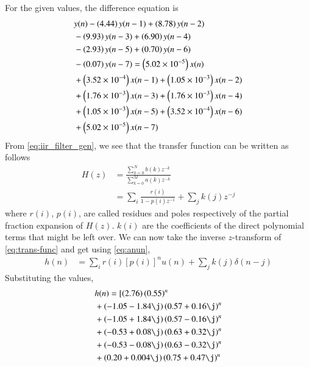 \documentclass[journal,12pt,twocolumn]{IEEEtran}
\renewcommand\thesection{\arabic{section}}
\begin{document}
\begin{enumerate}[label=\thesection.\arabic*]
\begin{enumerate}[label=\thesection.\arabic*]
	 For the given values, the difference equation is
	 \begin{align}
		 &y(n) - \left(4.44\right)y(n - 1) + \left(8.78\right)y(n - 2) \nonumber \\
		 &- \left(9.93\right)y(n - 3) + \left(6.90\right)y(n - 4) \nonumber \\
		 &- \left(2.93\right)y(n - 5) \nonumber + \left(0.70\right)y(n - 6) \nonumber \\
		 &- \left(0.07\right)y(n - 7) = \left(5.02 \times 10^{-5}\right)x(n) \nonumber \\
		 &+ \left(3.52 \times 10^{-4}\right)x(n - 1) + \left(1.05 \times 10^{-3}\right)x(n - 2) \nonumber \\
		 &+ \left(1.76 \times 10^{-3}\right)x(n - 3) + \left(1.76 \times 10^{-3}\right)x(n - 4) \nonumber \\
		 &+ \left(1.05 \times 10^{-3}\right)x(n - 5) + \left(3.52 \times 10^{-4}\right)x(n - 6) \nonumber \\
		 &+ \left(5.02 \times 10^{-5}\right)x(n - 7)
	 \end{align}
	 From \eqref{eq:iir_filter_gen}, we see that the transfer function can be written as follows
	 \begin{align}
		 H(z) &= \frac{\sum_{k = 0}^{N}b(k)z^{-k}}{\sum_{k = 0}^{M}a(k)z^{-k}} \\
			  &= \sum_{i}\frac{r(i)}{1 - p(i)z^{-1}} + \sum_{j}k(j)z^{-j}
		 \label{eq:trans-func}
	 \end{align}
	 where $r(i)$, $p(i)$, are called residues and poles respectively of the partial 
	 fraction expansion of $H(z)$. $k(i)$ are the coefficients of the direct polynomial 
	 terms that might be left over. We can now take the inverse $z$-transform of
	 \eqref{eq:trans-func} and get using \eqref{eq:anun},
	 \begin{align}
		 h(n) &= \sum_{i}r(i)[p(i)]^nu(n) + \sum_{j}k(j)\delta(n - j)
		 \label{eq:h-n-expr}
	 \end{align}
	 Substituting the values,
	 \begin{align}
		 &h(n) = [\brak{2.76}\brak{0.55}^n \nonumber \\ 
		 &+ \brak{-1.05-1.84\j}\brak{0.57+0.16\j}^n \nonumber \\
		 &+ \brak{-1.05+1.84\j}\brak{0.57-0.16\j}^n \nonumber \\
		 &+ \brak{-0.53+0.08\j}\brak{0.63+0.32\j}^n \nonumber \\
		 &+ \brak{-0.53-0.08\j}\brak{0.63-0.32\j}^n \nonumber \\
		 &+ \brak{0.20+0.004\j}\brak{0.75+0.47\j}^n \nonumber \\

\end{align}
\end{enumerate}
\end{enumerate}
\end{document}
